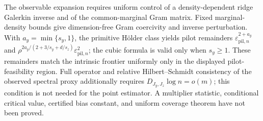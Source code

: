 The observable expansion requires uniform control of a density-dependent ridge Galerkin inverse and of the common-marginal Gram matrix.  Fixed marginal-density bounds give dimension-free Gram coercivity and inverse perturbation.  With \(a_y=\min\{s_y,1\}\), the primitive H\"older class yields pilot remainders \(\varepsilon_{\mathrm{pil},n}^{2+a_y}\) and \(\rho^{2a_y/(2+3/s_y+d/s_z)}\varepsilon_{\mathrm{pil},n}^2\); the cubic formula is valid only when \(s_y\ge1\).  These remainders match the intrinsic frontier uniformly only in the displayed pilot-feasibility region.  Full operator and relative Hilbert--Schmidt consistency of the observed spectral proxy additionally requires \(D_{J_y,J_z}\log n=o(m)\); this condition is not needed for the point estimator.  A multiplier statistic, conditional critical value, certified bias constant, and uniform coverage theorem have not been proved.